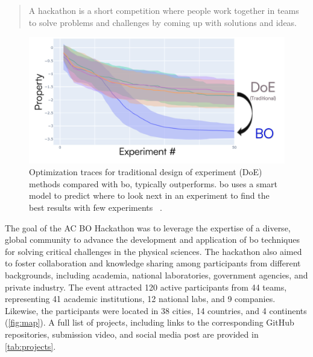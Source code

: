 \documentclass[superscriptaddress, nofootinbib,  amsmath, amssymb, twocolumn]{revtex4-2} %
\let\originalcite\cite
\renewcommand{\cite}[1]{\unskip~\originalcite{#1}}
\begin{document}
\begin{quote}
A hackathon is a short competition where people work together in teams to solve problems and challenges by coming up with solutions and ideas.
\end{quote}

\begin{figure}
    \centering
    \includegraphics[width=1\linewidth]{latex/figures/intro-bo.png}
    \caption{Optimization traces for traditional design of experiment (DoE) methods compared with \gls{bo}, typically outperforms. \Gls{bo} uses a smart model to predict where to look next in an experiment to find the best results with few experiments \cite{baird_building_2023}.}
    \label{fig:intro-bo}
\end{figure}

The goal of the AC BO Hackathon was to leverage the expertise of a diverse, global community to advance the development and application of \gls{bo} techniques for solving critical challenges in the physical sciences. The hackathon also aimed to foster collaboration and knowledge sharing among participants from different backgrounds, including academia, national laboratories, government agencies, and private industry. The event attracted 120 active participants from 44 teams, representing 41 academic institutions, 12 national labs, and 9 companies. Likewise, the participants were located in 38 cities, 14 countries, and 4 continents (\cref{fig:map}). A full list of projects, including links to the corresponding GitHub repositories, submission video, and social media post are provided in \cref{tab:projects}.

\end{document}
